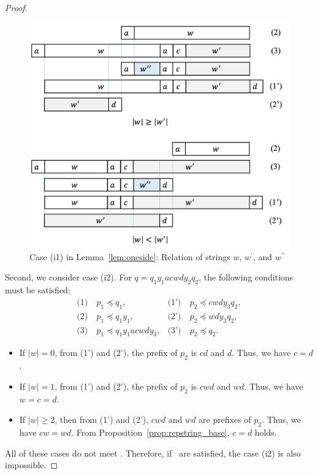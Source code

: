 \begin{proof}
  \begin{figure}[t]
    \begin{center}
      \includegraphics[scale=0.345]{figs/centerproof2.pdf}
      \caption{Case (i1) in Lemma~\ref{lem:oneside}: Relation of strings $w$, $w^{\prime}$, and $w^{\prime\prime}$}\label{fig:centerproof2}
    \end{center}
    \end{figure}

Second, we consider case (i2).
For $q=q_{1}y_{1}acwdy_{2}q_{2}$, the following conditions must be satisfied:
\begin{align*}
  \textrm{(1)}~& p_{1} \preceq q_{1}, & \textrm{(1')}~& p_{2} \preceq cwdy_{3}q_{2}, \\
  \textrm{(2)}~& p_{1} \preceq q_{1}y_{1}, & \textrm{(2')}~& p_{2} \preceq wdy_{3}q_{2}, \\
  \textrm{(3)}~& p_{1} \preceq q_{1}y_{1}acwdy_{3}, & \textrm{(3')}~& p_{2} \preceq q_{2}.
\end{align*}

\begin{itemize}
\item If $|w|=0$, from (1') and (2'), the prefix of $p_{2}$ is $cd$ and $d$. Thus, we have $c=d$.
\item If $|w|=1$, from (1') and (2'), the prefix of $p_{2}$ is $cwd$ and $wd$. Thus, we have $w=c=d$.
\item If $|w| \ge 2$, then from (1') and (2'), $cwd$ and $wd$ are prefixes of $p_{2}$. Thus, we have $cw=wd$. From Proposition~\ref{prop:repstring_base}, $c=d$ holds.
\end{itemize}
All of these cases do not meet \TheConditionB.
Therefore, if \TheConditionB\ are satisfied, the case (i2) is also impossible.


\end{proof}
